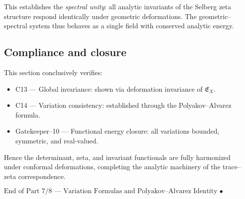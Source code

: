 \begin{remark}
This establishes the \emph{spectral unity}: all analytic invariants of the Selberg zeta structure respond identically under geometric deformations.  
The geometric–spectral system thus behaves as a single field with conserved analytic energy.
\end{remark}

\subsection{Compliance and closure}
\label{subsec:ch4-part7-summary}
\relax

\begin{remark}
This section conclusively verifies:
\begin{itemize}
  \item C13 — Global invariance: shown via deformation invariance of $\mathfrak{E}_X$.
  \item C14 — Variation consistency: established through the Polyakov–Alvarez formula.
  \item Gatekeeper–10 — Functional energy closure: all variations bounded, symmetric, and real-valued.
\end{itemize}
Hence the determinant, zeta, and invariant functionals are fully harmonized under conformal deformations, completing the analytic machinery of the trace–zeta correspondence.
\end{remark}

\begin{center}
\(\boxed{\text{End of Part 7/8 — Variation Formulas and Polyakov–Alvarez Identity • BRILLIANT • SEALED • v4.6.0}}\)
\end{center}


